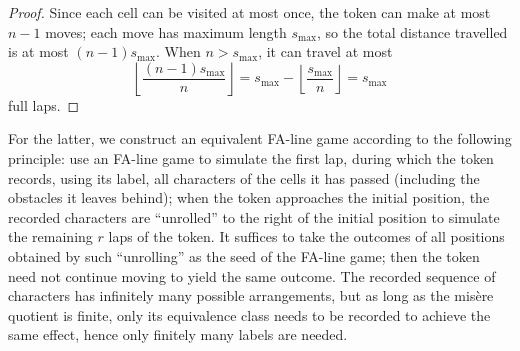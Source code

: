 \documentclass[11pt]{article}
\theoremstyle{definition}
\theoremstyle{plain}
\begin{document}
\begin{proof}
    Since each cell can be visited at most once, the token can make at most $n-1$ moves; each move has maximum length $s_{\max}$, so the total distance travelled is at most $(n-1)s_{\max}$.
    When $n> s_{\max}$, it can travel at most
    \[
        \left\lfloor \frac{(n-1)s_{\max}}{n} \right\rfloor = s_{\max}-\left\lfloor \frac{s_{\max}}{n} \right\rfloor = s_{\max}
    \]
    full laps.
\end{proof}

For the latter, we construct an equivalent FA-line game according to the following principle:
use an FA-line game to simulate the first lap, during which the token records, using its label, all characters of the cells it has passed (including the obstacles it leaves behind);
when the token approaches the initial position, the recorded characters are ``unrolled'' to the right of the initial position to simulate the remaining $r$ laps of the token.
It suffices to take the outcomes of all positions obtained by such ``unrolling'' as the seed of the FA-line game; then the token need not continue moving to yield the same outcome.
The recorded sequence of characters has infinitely many possible arrangements, but as long as the misère quotient is finite, only its equivalence class needs to be recorded to achieve the same effect, hence only finitely many labels are needed.
\end{document}
